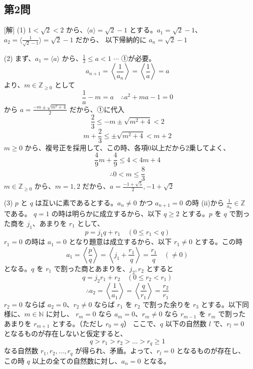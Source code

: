 \documentclass[../main.tex]{subfiles}
\begin{document}
\begin{center}
\end{center}

\subsection*{第2問}
[解]
(1) $1 < \sqrt{2} < 2$ から、$\langle a \rangle = \sqrt{2}-1$ とする。$a_1 = \sqrt{2}-1$、$a_2 = \langle \frac{1}{\sqrt{2}-1} \rangle = \sqrt{2}-1$ だから、
以下帰納的に $a_n = \sqrt{2}-1$

(2) まず、$a_1 = \langle a \rangle$ から、$\frac{1}{2} \le a < 1$ $\cdots$ ①が必要。
\[ a_{n+1} = \left\langle \frac{1}{a_n} \right\rangle = \left\langle \frac{1}{a} \right\rangle = a \]
より、$m \in \mathbb{Z}_{\ge 0}$ として
\[ \frac{1}{a} - m = a \quad \therefore a^2 + ma - 1 = 0 \]
から $a = \frac{-m \pm \sqrt{m^2+4}}{2}$ だから、①に代入
\[ \frac{2}{3} \le -m \pm \sqrt{m^2+4} < 2 \]
\[ m + \frac{2}{3} \le \pm \sqrt{m^2+4} < m + 2 \]
$m \ge 0$ から、複号正を採用して、この時、各項0以上だから2乗してよく、
\[ \frac{4}{9} m + \frac{4}{9} \le 4 < 4m + 4 \]
\[ \therefore 0 < m \le \frac{8}{3} \]
$m \in \mathbb{Z}_{\ge 0}$ から、$m = 1, 2$ だから、$a = \frac{-1+\sqrt{5}}{2}, -1+\sqrt{2}$

(3) $p$ と $q$ は互いに素であるとする。$a_n \neq 0$ かつ $a_{n+1}=0$ の時 (ii)から $\frac{1}{a_n} \in \mathbb{Z}$ である。
$q=1$ の時は明らかに成立するから、以下 $q \ge 2$ とする。$p$ を $q$ で割った商を $j_1$、あまりを $r_1$ として、
\[ p = j_1 q + r_1 \quad (0 \le r_1 < q) \]
$r_1=0$ の時は $a_1 = 0$ となり題意は成立するから、以下 $r_1 \neq 0$ とする。この時
\[ a_1 = \left\langle \frac{p}{q} \right\rangle = \left\langle j_1 + \frac{r_1}{q} \right\rangle = \frac{r_1}{q} \quad (\neq 0) \]
となる。$q$ を $r_1$ で割った商とあまりを、$j_2, r_2$ とすると
\[ q = j_2 r_1 + r_2 \quad (0 \le r_2 < r_1) \]
\[ \therefore a_2 = \left\langle \frac{1}{a_1} \right\rangle = \left\langle \frac{q}{r_1} \right\rangle = \frac{r_2}{r_1} \]
$r_2=0$ ならば $a_2=0$、$r_2 \neq 0$ ならば $r_1$ を $r_2$ で割った余りを $r_3$ とする。以下同様に、$m \in \mathbb{N}$ に対し、
$r_m = 0$ なら $a_m = 0$、$r_m \neq 0$ なら $r_{m-1}$ を $r_m$ で割ったあまりを $r_{m+1}$ とする。（ただし $r_0 = q$）
ここで、$q$ 以下の自然数 $l$ で、$r_l = 0$ となるものが存在しないと仮定すると、
\[ q > r_1 > r_2 > \dots > r_q \ge 1 \]
なる自然数 $r_1, r_2, \dots, r_q$ が得られ、矛盾。よって、$r_l = 0$ となるものが存在し、この時 $q$ 以上の全ての自然数に対し、$a_n = 0$ となる。
\end{document}
